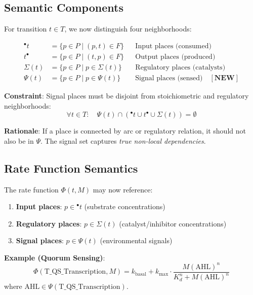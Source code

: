 \documentclass[11pt]{article}
\newcommand{\preset}[1]{{\ensuremath{^{\bullet}#1}}}
\newcommand{\postset}[1]{{\ensuremath{#1^{\bullet}}}}
\newcommand{\RegSet}[1]{{\Sigma(#1)}}
\newcommand{\SignalSet}[1]{{\Psi(#1)}}
\begin{document}
\subsection{Semantic Components}

For transition $t \in T$, we now distinguish four neighborhoods:

\begin{equation}
\begin{aligned}
\preset{t} &= \{p \in P \mid (p,t) \in F\} && \text{Input places (consumed)} \\
\postset{t} &= \{p \in P \mid (t,p) \in F\} && \text{Output places (produced)} \\
\RegSet{t} &= \{p \in P \mid p \in \Sigma(t)\} && \text{Regulatory places (catalysts)} \\
\SignalSet{t} &= \{p \in P \mid p \in \Psi(t)\} && \text{Signal places (sensed)} \quad \mathbf{[NEW]}
\end{aligned}
\end{equation}

\textbf{Constraint}: Signal places must be disjoint from stoichiometric and regulatory neighborhoods:
\begin{equation}
\forall t \in T: \quad \SignalSet{t} \cap (\preset{t} \cup \postset{t} \cup \RegSet{t}) = \emptyset
\label{eq:signal_disjoint}
\end{equation}

\textbf{Rationale}: If a place is connected by arc or regulatory relation, it should not also be in $\Psi$. The signal set captures \emph{true non-local dependencies}.

\subsection{Rate Function Semantics}

The rate function $\Phi(t, M)$ may now reference:
\begin{enumerate}
    \item \textbf{Input places}: $p \in \preset{t}$ (substrate concentrations)
    \item \textbf{Regulatory places}: $p \in \RegSet{t}$ (catalyst/inhibitor concentrations)
    \item \textbf{Signal places}: $p \in \SignalSet{t}$ (environmental signals)
\end{enumerate}

\textbf{Example (Quorum Sensing)}:
\begin{equation}
\Phi(\text{T\_QS\_Transcription}, M) = k_{\text{basal}} + k_{\text{max}} \cdot \frac{M(\text{AHL})^n}{K_d^n + M(\text{AHL})^n}
\end{equation}
where $\text{AHL} \in \SignalSet{\text{T\_QS\_Transcription}}$.
\end{document}
